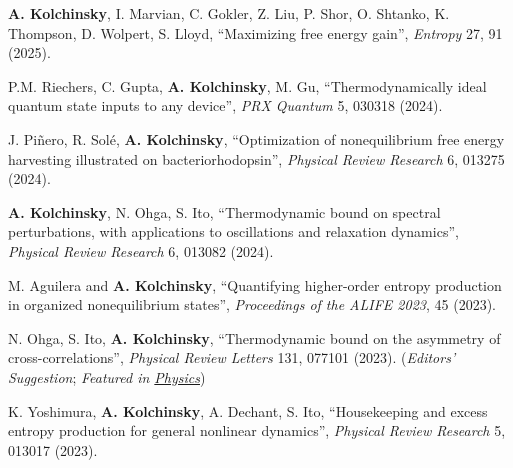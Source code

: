 \textbf{A. Kolchinsky}\CA, I. Marvian, C. Gokler, Z. Liu, P. Shor, O. Shtanko, K. Thompson, D. Wolpert, S. Lloyd, ``Maximizing free energy gain'', \emph{Entropy} 27, 91 (2025).   %

P.M. Riechers, C. Gupta, \textbf{A. Kolchinsky}, M. Gu, ``Thermodynamically ideal quantum state inputs to any device'', \emph{PRX Quantum} 5, 030318 (2024).   %

J. Piñero, R. Solé, \textbf{A. Kolchinsky}\CA, ``Optimization of nonequilibrium free energy harvesting illustrated on bacteriorhodopsin'', \emph{Physical Review Research} 6, 013275 (2024).  

\textbf{A. Kolchinsky}\CA, N. Ohga, S. Ito, ``Thermodynamic bound on spectral perturbations, with applications to oscillations and relaxation dynamics'', \emph{Physical Review Research} 6, 013082 (2024).  

M. Aguilera and \textbf{A. Kolchinsky}, ``Quantifying higher-order entropy production in organized nonequilibrium states'', \emph{Proceedings of the ALIFE 2023}, 45 (2023).  

N. Ohga, S. Ito, \textbf{A. Kolchinsky}, ``Thermodynamic bound on the asymmetry of cross-correlations'', \emph{Physical Review Letters} 131, 077101 (2023).   (\emph{Editors' Suggestion}; \emph{Featured in \href{https://physics.aps.org/articles/v16/142}{Physics}})

K. Yoshimura, \textbf{A. Kolchinsky}, A. Dechant, S. Ito, ``Housekeeping and excess entropy production for general nonlinear dynamics'', \emph{Physical Review Research}  5, 013017 (2023).  

